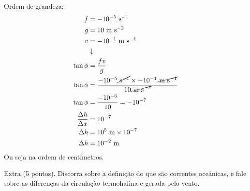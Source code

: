 \documentclass[letterpaper,portuguese,12pt,pdftex]{exam}
\begin{document}
\begin{questions}
\begin{solution}
  Ordem de grandeza:
\begin{align*}
  f &= -10^{-5} \text { s}^{-1} \\
  g &= 10 \text{ m s}^{-2} \\
  v & = -10^{-1} \text{ m s}^{-1} \\
  &\downarrow \\
 \tan\phi &= \frac{fv}{g} \\
 \tan\phi &= \frac{-10^{-5} \cancel{\text { s}^{-1}} \times -10^{-1} \cancel{\text{ m s}^{-1}}}{10 \cancel{\text{ m s}^{-2}}} \\
 \tan\phi &= \frac{-10^{-6}}{10} = -10^{-7} \\
 \frac{\Delta h}{\Delta x} &= 10^{-7} \\
 \Delta h &= 10^5\text{ m} \times 10^{-7} \\
  \Delta h &= 10^{-2}\text{ m} \\
\end{align*}
Ou seja na ordem de centímetros.

\end{solution}

\question
Extra (5 pontos).
Discorra sobre a definição do que são correntes oceânicas, e fale sobre as
diferenças da circulação termohalina e gerada pelo vento.

\end{questions}
\end{document}
